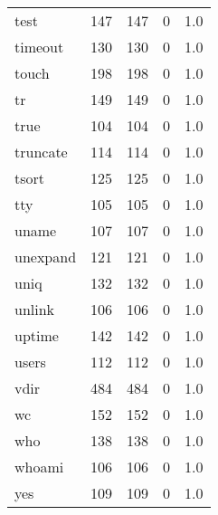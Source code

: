 \begin{longtable}{lrrrr}
test      &                     147 &              147 &                 0 &                          1.0 \\
timeout   &                     130 &              130 &                 0 &                          1.0 \\
touch     &                     198 &              198 &                 0 &                          1.0 \\
tr        &                     149 &              149 &                 0 &                          1.0 \\
true      &                     104 &              104 &                 0 &                          1.0 \\
truncate  &                     114 &              114 &                 0 &                          1.0 \\
tsort     &                     125 &              125 &                 0 &                          1.0 \\
tty       &                     105 &              105 &                 0 &                          1.0 \\
uname     &                     107 &              107 &                 0 &                          1.0 \\
unexpand  &                     121 &              121 &                 0 &                          1.0 \\
uniq      &                     132 &              132 &                 0 &                          1.0 \\
unlink    &                     106 &              106 &                 0 &                          1.0 \\
uptime    &                     142 &              142 &                 0 &                          1.0 \\
users     &                     112 &              112 &                 0 &                          1.0 \\
vdir      &                     484 &              484 &                 0 &                          1.0 \\
wc        &                     152 &              152 &                 0 &                          1.0 \\
who       &                     138 &              138 &                 0 &                          1.0 \\
whoami    &                     106 &              106 &                 0 &                          1.0 \\
yes       &                     109 &              109 &                 0 &                          1.0 \\
\end{longtable}
